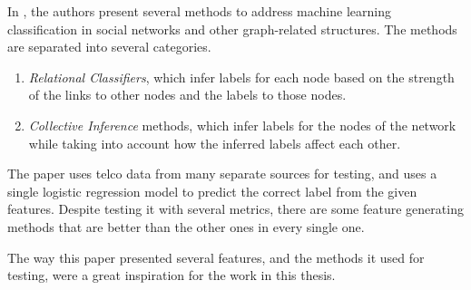 In \cite{oskarsdottir2016}, the authors present several methods to address machine learning classification in social networks and other graph-related structures.
The methods are separated into several categories.

\begin{enumerate}
	\item \emph{Relational Classifiers}, which infer labels for each node based on the strength of the links to other nodes and the labels to those nodes.
	\item \emph{Collective Inference} methods, which infer labels for the nodes of the network while taking into account how the inferred labels affect each other.
\end{enumerate}

The paper uses telco data from many separate sources for testing, and uses a single logistic regression model to predict the correct label from the given features.
Despite testing it with several metrics, there are some feature generating methods that are better than the other ones in every single one.

The way this paper presented several features, and the methods it used for testing, were a great inspiration for the work in this thesis.
